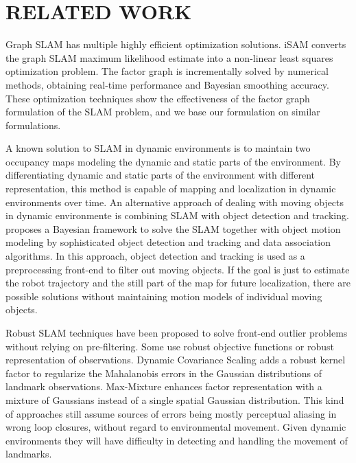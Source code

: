 \section{RELATED WORK}

Graph SLAM has multiple highly efficient optimization solutions.
iSAM \cite{isam} converts the graph SLAM maximum likelihood estimate into a
non-linear least squares optimization problem.  The factor graph is incrementally solved by numerical methods, obtaining real-time performance and Bayesian smoothing accuracy. These optimization techniques show the effectiveness of the factor graph formulation of the SLAM problem, and we base our formulation on similar formulations.


A known solution\cite{wolf05} to SLAM in dynamic environments is to maintain two occupancy
maps modeling the dynamic and static parts of the environment. By
differentiating dynamic and static parts of the environment with different
representation, this method is capable of mapping and localization in dynamic
environments over time. An alternative approach of dealing with
moving objects in dynamic environmente is combining SLAM with
object detection and tracking. \cite{wang2003online} proposes a Bayesian
framework to solve the SLAM together with object motion modeling by
sophisticated object detection and tracking and data association algorithms.
In this approach, object detection and tracking is used as a preprocessing
front-end to filter out moving objects. If the goal is just to estimate the
robot trajectory and the still part of the map for future localization, there
are possible solutions without maintaining motion models of individual moving objects.

Robust SLAM techniques have been proposed to solve front-end outlier problems
without relying on pre-filtering. Some use robust objective functions or robust
representation of observations. Dynamic Covariance Scaling\cite{DCS} adds a
robust kernel factor to regularize the Mahalanobis errors in the Gaussian
distributions of landmark observations.  Max-Mixture\cite{mm} enhances factor
representation with a mixture of Gaussians instead of a single spatial Gaussian
distribution. This kind of approaches still assume sources of errors being
mostly perceptual aliasing in wrong loop closures, without regard to
environmental movement.  Given dynamic environments they will have difficulty
in detecting and handling the movement of landmarks.

